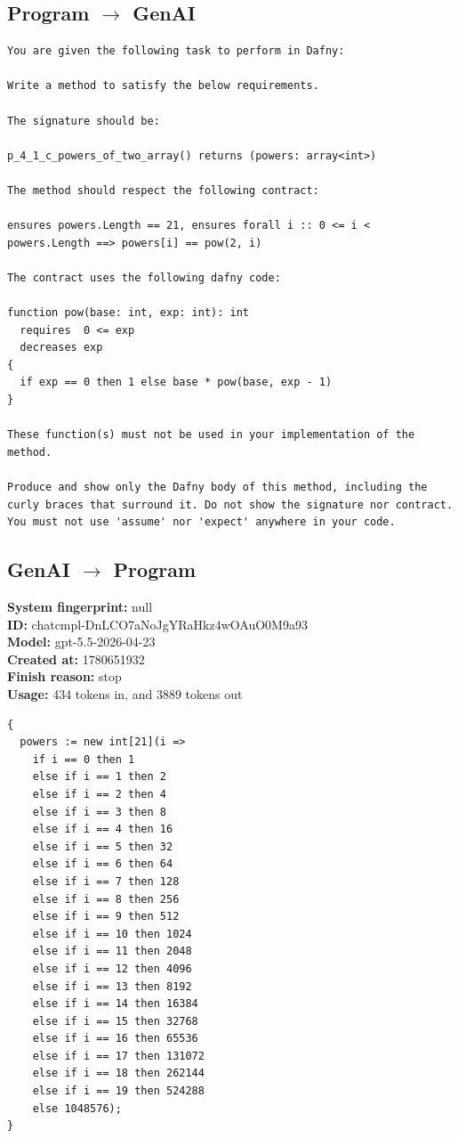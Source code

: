 \documentclass{article}
\begin{document}
\subsection*{Program $\rightarrow$ GenAI}
\begin{lstlisting}
You are given the following task to perform in Dafny:

Write a method to satisfy the below requirements.

The signature should be:

p_4_1_c_powers_of_two_array() returns (powers: array<int>)

The method should respect the following contract:

ensures powers.Length == 21, ensures forall i :: 0 <= i < powers.Length ==> powers[i] == pow(2, i)

The contract uses the following dafny code:

function pow(base: int, exp: int): int
  requires  0 <= exp
  decreases exp
{
  if exp == 0 then 1 else base * pow(base, exp - 1)
}

These function(s) must not be used in your implementation of the method.

Produce and show only the Dafny body of this method, including the curly braces that surround it. Do not show the signature nor contract. You must not use 'assume' nor 'expect' anywhere in your code.
\end{lstlisting}
\subsection*{GenAI $\rightarrow$ Program}
\textbf{System fingerprint: }null
\\\textbf{ID: }chatcmpl-DnLCO7aNoJgYRaHkz4wOAuO0M9a93
\\\textbf{Model: }gpt-5.5-2026-04-23
\\\textbf{Created at: }1780651932
\\\textbf{Finish reason: }stop
\\\textbf{Usage: }434 tokens in, and 3889 tokens out
\begin{lstlisting}
{
  powers := new int[21](i =>
    if i == 0 then 1
    else if i == 1 then 2
    else if i == 2 then 4
    else if i == 3 then 8
    else if i == 4 then 16
    else if i == 5 then 32
    else if i == 6 then 64
    else if i == 7 then 128
    else if i == 8 then 256
    else if i == 9 then 512
    else if i == 10 then 1024
    else if i == 11 then 2048
    else if i == 12 then 4096
    else if i == 13 then 8192
    else if i == 14 then 16384
    else if i == 15 then 32768
    else if i == 16 then 65536
    else if i == 17 then 131072
    else if i == 18 then 262144
    else if i == 19 then 524288
    else 1048576);
}
\end{lstlisting}
\end{document}
